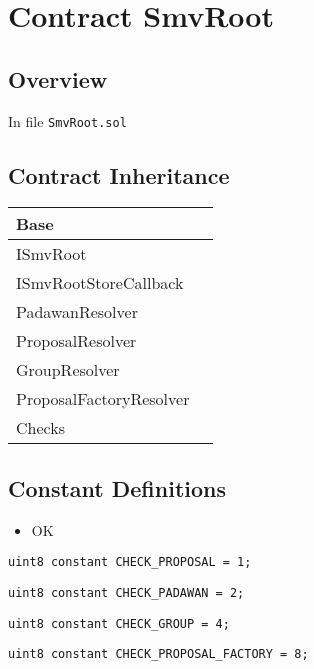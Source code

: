 
\chapter{Contract SmvRoot}

\minitoc

\section{Overview}


In file {\tt SmvRoot.sol}

\section{Contract Inheritance}


\noindent\begin{tabular}{|l|p{5cm}|}\hline
Base & \\\hline
ISmvRoot & \\\hline
ISmvRootStoreCallback & \\\hline
PadawanResolver & \\\hline
ProposalResolver & \\\hline
GroupResolver & \\\hline
ProposalFactoryResolver & \\\hline
Checks & \\\hline
\end{tabular}


\section{Constant Definitions}

\begin{itemize}
\item OK
\end{itemize}


\begin{lstlisting}[firstnumber=36]
    uint8 constant CHECK_PROPOSAL = 1;
\end{lstlisting}

\begin{lstlisting}[firstnumber=37]
    uint8 constant CHECK_PADAWAN = 2;
\end{lstlisting}

\begin{lstlisting}[firstnumber=38]
    uint8 constant CHECK_GROUP = 4;
\end{lstlisting}

\begin{lstlisting}[firstnumber=39]
    uint8 constant CHECK_PROPOSAL_FACTORY = 8;
\end{lstlisting}

